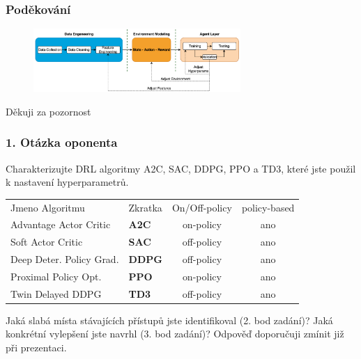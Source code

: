 \begin{frame}
    \frametitle{Poděkování}
    \begin{center}
        \begin{figure}
            \centering
            \includegraphics[width=0.7\textwidth]{img/navrh_reseni}
        \end{figure}
        \vspace{0.5cm}
        \Huge Děkuji za pozornost
    \end{center}
\end{frame}

\begin{frame}
    \frametitle{1. Otázka oponenta}
    \large{Charakterizujte DRL algoritmy A2C, SAC, DDPG, PPO a TD3, které jste použil k nastavení hyperparametrů.}

    \begin{table}
        \centering
        {\footnotesize
            \begin{tabular}{llcc}
                Jmeno Algoritmu          & Zkratka       & On/Off-policy & policy-based \\

                Advantage Actor Critic   & \textbf{A2C}  & on-policy     & ano \\
                Soft Actor Critic        & \textbf{SAC}  & off-policy    & ano \\
                Deep Deter. Policy Grad. & \textbf{DDPG} & off-policy    & ano \\
                Proximal Policy Opt.     & \textbf{PPO}  & on-policy     & ano \\
                Twin Delayed DDPG        & \textbf{TD3}  & off-policy    & ano \\
            \end{tabular}
        }
        \label{tab:algo}
    \end{table}

    \vspace{0.5cm}

    \large{Jaká slabá místa stávajících přístupů jste identifikoval (2. bod zadání)? Jaká konkrétní vylepšení jste navrhl (3. bod zadání)? Odpověď doporučuji zmínit již při prezentaci.}
\end{frame}

